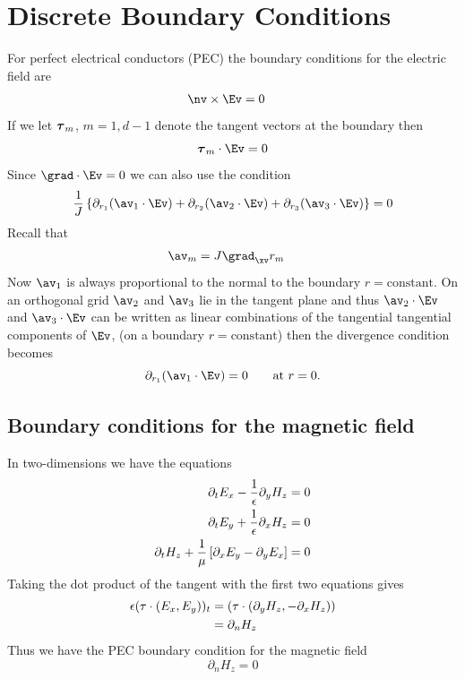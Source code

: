 \documentclass[10pt]{article}
\begin{document}
\section{Discrete Boundary Conditions}

\newcommand{\pra}{\partial_{r_1}}
\newcommand{\prb}{\partial_{r_2}}
\newcommand{\prc}{\partial_{r_3}}

For perfect electrical conductors (PEC) the boundary conditions for the electric field are
\begin{align}
  \nv\times\Ev & = 0
\end{align}
If we let $\boldsymbol{\tau}_m$, $m=1,d-1$ denote the tangent vectors at the boundary then
\[
  \tauv_m\cdot\Ev=0
\]
Since $\grad\cdot\Ev=0$ we can also use the condition
\[
  {1\over J}\left\{ \pra( \av_1\cdot\Ev) + \prb( \av_2\cdot\Ev) + \prc( \av_3\cdot\Ev) \right\} =0
\]
Recall that
\begin{align*}
   \av_m &= J \grad_{\xv} r_m
\end{align*}
Now $\av_1$ is always proportional to the normal to the boundary $r=\mbox{constant}$. 
On an orthogonal grid $\av_2$ and $\av_3$ lie in the tangent plane and thus
$\av_2\cdot\Ev$ and $\av_3\cdot\Ev$ can be written as linear combinations of the
tangential tangential components of $\Ev$, (on a boundary $r=\mbox{constant}$) then
the divergence condition becomes
\[
  \pra( \av_1\cdot\Ev ) =0 \qquad \mbox{at $r=0$}.
\]

\subsection{Boundary conditions for the magnetic field}

In two-dimensions we have the equations
\begin{align*}
\partial_t E_x - {1\over \epsilon} \partial_y H_z &=0 \\
\partial_t E_y + {1\over \epsilon} \partial_x H_z &=0 \\
\partial_t H_z + {1\over \mu } \left[ \partial_x E_y - \partial_y E_x \right] &=0 
\end{align*}
Taking the dot product of the tangent with the first two equations gives
\begin{align*}
  \epsilon (\tau\cdot(E_x,E_y))_t & = ( \tau\cdot(\partial_y H_z,-\partial_x H_z) ) \\
                              & = \partial_n H_z
\end{align*}
Thus we have the PEC boundary condition for the magnetic field
\[
   \partial_n H_z = 0 
\]
\end{document}
